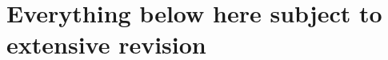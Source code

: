 \documentclass{article}
\begin{document}
\begin{table}[ht]
\begin{tabular}{l l l l r}
    \bottomrule
  \end{tabular}
\end{table}


\newpage
\vspace{20mm}

\section{Everything below here subject to extensive revision}

\vspace{20mm}
\end{document}
